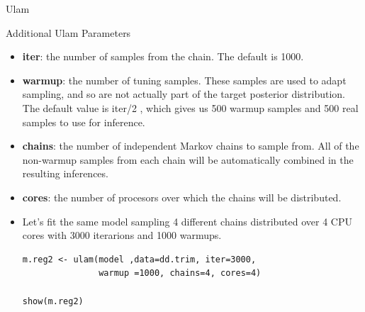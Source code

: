\documentclass[handout]{beamer}
\begin{document}
\begin{frame}[fragile]{Ulam}
\scriptsize{


\begin{block}{Additional Ulam Parameters}
\begin{itemize}


\item \textbf{iter}: the number of samples from the chain. The default is 1000.
\item \textbf{warmup}: the number of tuning samples. These samples are used to adapt sampling, and so are not actually part of the target posterior distribution. The default value is iter/2 , which gives us 500 warmup samples and 500 real samples to use for inference.

\item \textbf{chains}: the number of independent Markov chains to sample from. All of the non-warmup samples from each chain will be automatically combined in the resulting inferences.

\item \textbf{cores}: the number of procesors over which the chains will be distributed.



 \end{itemize}

 \end{block}

\begin{itemize}


\item Let's fit the same model sampling 4 different chains distributed over 4 CPU cores with 3000 iterarions and 1000  warmups.

\begin{verbatim}
m.reg2 <- ulam(model ,data=dd.trim, iter=3000, 
               warmup =1000, chains=4, cores=4) 

show(m.reg2) 
\end{verbatim}


 \end{itemize}




} 
\end{frame}
\end{document}
